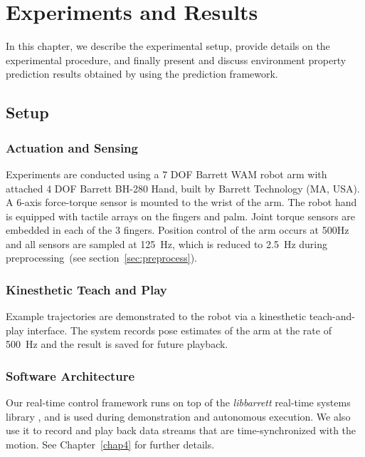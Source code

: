 \chapter{Experiments and Results}
\label{chap5}

In this chapter, we describe the experimental setup, provide details on the experimental procedure, and finally present and discuss environment property prediction results obtained by using the prediction framework.


\section{Setup}

\subsection{Actuation and Sensing}
\label{sec:actuation_and_sensing}

Experiments are conducted using a 7 DOF Barrett WAM robot arm with attached 4 DOF Barrett BH-280 Hand, built by Barrett Technology (MA, USA).
A 6-axis force-torque sensor is mounted to the wrist of the arm.
The robot hand is equipped with tactile arrays on the fingers and palm.
Joint torque sensors are embedded in each of the 3 fingers.
Position control of the arm occurs at 500Hz and all sensors are sampled at 125~Hz, which is reduced to 2.5~Hz during preprocessing~(see section~\ref{sec:preprocess}).

\subsection{Kinesthetic Teach and Play}
\label{sec:kinesthetic_teach_and_play}

Example trajectories are demonstrated to the robot via a kinesthetic teach-and-play interface.
The system records pose estimates of the arm at the rate of 500~Hz and the result is saved for future playback.

\subsection{Software Architecture}
\label{sec:software_architecture}

Our real-time control framework runs on top of the {\em libbarrett} real-time systems library \cite{libbarrett}, and is used during demonstration and autonomous execution.
We also use it to record and play back data streams that are time-synchronized with the motion.
See Chapter~\ref{chap4} for further details.


